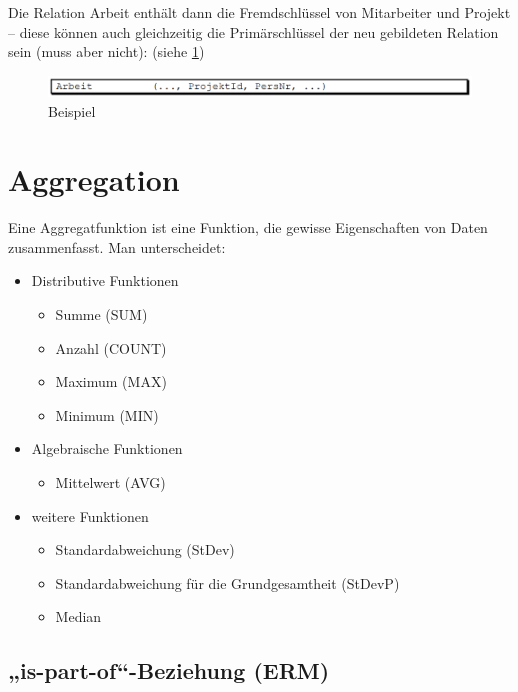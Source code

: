 Die Relation Arbeit enthält dann die Fremdschlüssel von Mitarbeiter und Projekt – diese können auch gleichzeitig die Primärschlüssel der neu gebildeten Relation sein (muss aber nicht): (siehe \ref{fig:modellierung:mitproj4})

\begin{figure}[h]
    \centering
    \includegraphics[width=.8\textwidth]{Content/images/modellierung/mitproj4.png}
    \caption{Beispiel}
    \label{fig:modellierung:mitproj4}
\end{figure}

\section{Aggregation}

Eine Aggregatfunktion ist eine Funktion, die gewisse Eigenschaften von Daten zusammenfasst.
Man unterscheidet:

\begin{itemize}
    \item Distributive Funktionen
    \begin{itemize}
        \item Summe (SUM)
        \item Anzahl (COUNT)
        \item Maximum (MAX)
        \item Minimum (MIN)
    \end{itemize}
    \item Algebraische Funktionen
    \begin{itemize}
        \item Mittelwert (AVG)
    \end{itemize}
    \item weitere Funktionen
    \begin{itemize}
        \item Standardabweichung (StDev)
        \item Standardabweichung für die Grundgesamtheit (StDevP)
        \item Median
    \end{itemize}
\end{itemize}

\subsection{„is-part-of“-Beziehung (ERM)}

